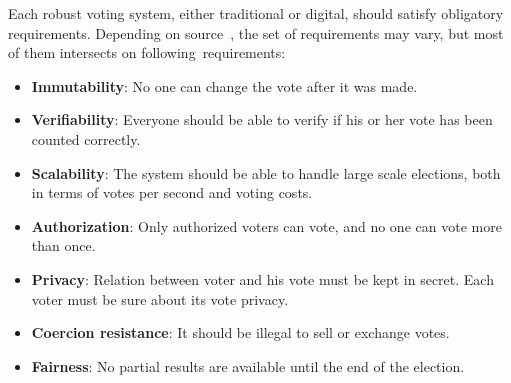 \documentclass[applsci,article,accept,moreauthors,pdftex]{Definitions/mdpi}
\begin{document}
Each robust voting system, either traditional or digital, should satisfy obligatory requirements. Depending on source~\cite{applied_cryptography,sadia2019blockchain,hjalmarsson2018blockchain,ayed2017conceptual,vo2019votereum,qadah2005requirements}, the set of requirements may vary, but most of them intersects on following~requirements:
\begin{itemize}
\item \textbf{Immutability}: No one can change the vote after it was made.
\item \textbf{Verifiability}: Everyone should be able to verify if his or her vote has been counted correctly.
\item \textbf{Scalability}: The system should be able to handle large scale elections, both in terms of votes per second and voting costs.
\item \textbf{Authorization}: Only authorized voters can vote, and no one can vote more than once.
\item \textbf{Privacy}: Relation between voter and his vote must be kept in secret. 
Each voter must be sure about its vote privacy. 
\item \textbf{Coercion resistance}: It should be illegal to sell or exchange votes.
\item \textbf{Fairness}: No partial results are available until the end of the election.
\end{itemize}
\end{document}
